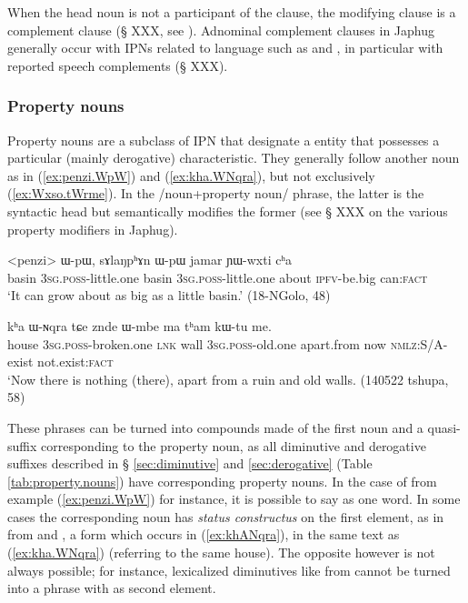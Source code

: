When the head noun is not a participant of the clause, the modifying clause is a complement clause (§ XXX, see \citealt[239-241]{jacques16complementation}). Adnominal complement clauses in Japhug generally occur with IPNs related to language such as  and , in particular with reported speech complements (§ XXX). 
\subsubsection{Property nouns} \label{sec:property.nouns}
Property nouns are a subclass of IPN that designate a entity that possesses a particular (mainly derogative) characteristic. They generally follow another noun as in (\ref{ex:penzi.WpW}) and (\ref{ex:kha.WNqra}), but not exclusively (\ref{ex:Wxso.tWrme}). In the /noun+property noun/ phrase, the latter is the syntactic head but semantically modifies the former (see § XXX on the various property modifiers in Japhug).  

\begin{exe}
\ex \label{ex:penzi.WpW}
 \gll <penzi> ɯ-pɯ, sɤlaŋpʰɤn ɯ-pɯ jamar ɲɯ-wxti cʰa  \\
 basin \textsc{3sg.poss}-little.one   basin \textsc{3sg.poss}-little.one  about \textsc{ipfv}-be.big can:\textsc{fact} \\
 \glt `It can grow about as big as a little basin.' (18-NGolo, 48)
\end{exe}

\begin{exe}
\ex \label{ex:kha.WNqra}
 \gll
kʰa ɯ-ɴqra tɕe znde ɯ-mbe ma tʰam kɯ-tu me. \\
house \textsc{3sg.poss}-broken.one \textsc{lnk} wall \textsc{3sg.poss}-old.one apart.from now \textsc{nmlz}:S/A-exist not.exist:\textsc{fact} \\ 
\glt `Now there is nothing (there), apart from a ruin and old walls. (140522 tshupa, 58)
\end{exe}

These phrases can be turned into compounds made of the first noun and a quasi-suffix corresponding to the property noun, as all diminutive and derogative suffixes described in § \ref{sec:diminutive} and \ref{sec:derogative} (Table \ref{tab:property.nouns}) have corresponding property nouns. In the case of   from example (\ref{ex:penzi.WpW}) for instance, it is possible to say  as one word. In some cases the corresponding noun has \textit{status constructus} on the first element, as in  from  and , a form which occurs in (\ref{ex:khANqra}), in the same text as  (\ref{ex:kha.WNqra}) (referring to the same house). The opposite however is not always possible; for instance, lexicalized diminutives like  from  cannot be turned into a phrase with  as second element.

